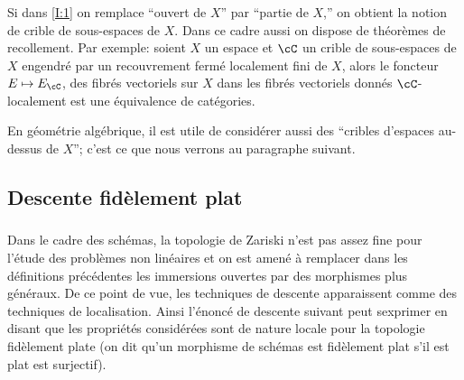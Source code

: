 \subsubsection{}\label{I:1-3-4}

Si dans \ref{I:1} on remplace ``ouvert de $X$'' par ``partie de 
$X$,'' on obtient la notion de crible de sous-espaces de $X$. Dans ce cadre 
aussi on dispose de théorèmes de recollement. Par exemple: soient $X$ un 
espace et $\cC$ un crible de sous-espaces de $X$ engendré par un recouvrement 
fermé localement fini de $X$, alors le foncteur $E\mapsto E_\cC$, des fibrés 
vectoriels sur $X$ dans les fibrés vectoriels donnés $\cC$-localement est une 
équivalence de catégories. 

En géométrie algébrique, il est utile de considérer aussi des ``cribles 
d'espaces au-dessus de $X$''; c'est ce que nous verrons au paragraphe suivant. 










\subsection{Descente fidèlement plat}\label{I:1-4}





\subsubsection{}\label{I:1-4-1}

Dans le cadre des schémas, la topologie de Zariski n'est pas assez fine pour 
l'étude des problèmes non linéaires et on est amené à remplacer dans les 
définitions précédentes les immersions ouvertes par des morphismes plus 
généraux. De ce point de vue, les techniques de descente apparaissent comme des 
techniques de localisation. Ainsi l'énoncé de descente suivant peut sexprimer 
en disant que les propriétés considérées sont de nature locale pour la 
topologie fidèlement plate (on dit qu'un morphisme de schémas est fidèlement 
plat s'il est plat est surjectif). 


